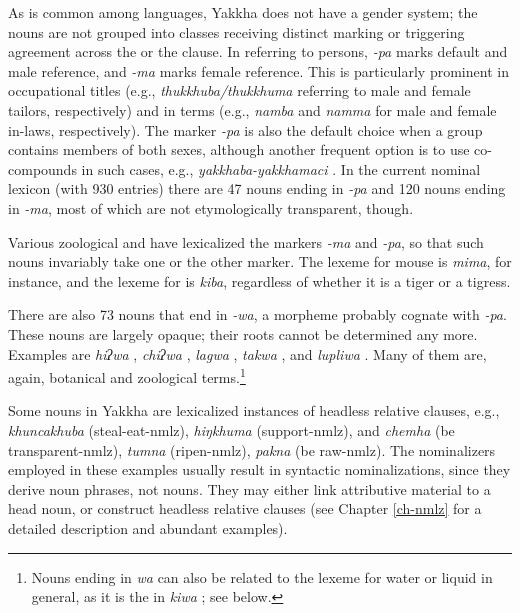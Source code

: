 As is common among  languages, Yakkha does not have a gender system; the nouns are not grouped into classes receiving distinct marking or triggering agreement across the  or the clause. In  referring to persons, \emph{-pa} marks default and male reference, and \emph{-ma} marks female reference. This is particularly prominent in occupational titles (e.g., \emph{thukkhuba/thuk\-khuma} referring to male and female tailors, respectively) and in  terms (e.g., \emph{namba} and \emph{namma} for male and female in-laws, respectively). The marker \emph{-pa} is also the default choice when a group contains members of both sexes, although another frequent option is to use co-compounds in such cases, e.g., \emph{yakkhaba-yakkhamaci} . In the current nominal lexicon (with 930 entries)  there are 47 nouns ending in \emph{-pa} and 120 nouns ending in \emph{-ma},  most of which are not etymologically transparent, though.

Various zoological and  have lexicalized the markers \emph{-ma} and \emph{-pa}, so that such nouns invariably take one or the other marker. The lexeme  for mouse is \emph{mima},  for instance,  and the lexeme for  is  \emph{kiba}, regardless of whether it is a  tiger or a tigress.

There are also 73 nouns that end in \emph{-wa}, a morpheme probably cognate with \emph{-pa}. These nouns are largely opaque; their roots cannot be determined any more. Examples are \emph{hiʔwa} , \emph{chiʔwa} , \emph{lagwa} , \emph{takwa} , and \emph{lupliwa} . Many of them are, again,  botanical and zoological terms.\footnote{Nouns ending in \emph{wa} can also be related to the lexeme for water or liquid in general, as it is the  in \emph{kiwa} ; see below.}

Some nouns in Yakkha are lexicalized instances of headless relative clauses, e.g.,  \emph{khuncakhuba}  (steal-eat-{\sc nmlz}), \emph{hiŋkhuma}  (support-{\sc nmlz}), and \emph{chemha}  (be transparent-{\sc nmlz}),  \emph{tumna}  (ripen-{\sc nmlz}), \emph{pakna}  (be raw-{\sc nmlz}). The nominalizers employed in these examples usually result in syntactic nominalizations, since they derive noun phrases, not nouns. They may either link attributive material to a head noun, or  construct headless relative clauses  (see  Chapter \ref{ch-nmlz} for a detailed description and abundant examples). 


